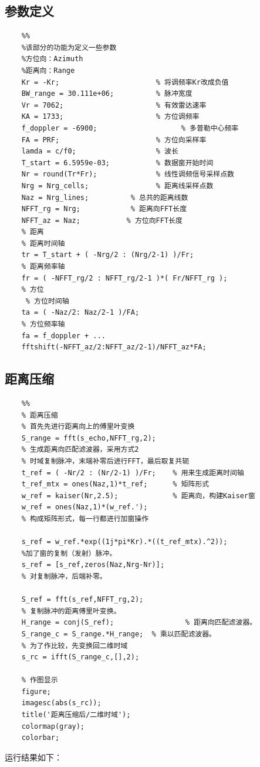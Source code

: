 \documentclass{article}
\begin{document}
\subsection{参数定义}
\begin{lstlisting}
	%%
	%该部分的功能为定义一些参数
	%方位向：Azimuth
	%距离向：Range
	Kr = -Kr;                       % 将调频率Kr改成负值
	BW_range = 30.111e+06;          % 脉冲宽度
	Vr = 7062;                      % 有效雷达速率
	KA = 1733;                      % 方位调频率
	f_doppler = -6900;                    % 多普勒中心频率
	FA = PRF;                       % 方位向采样率
	lamda = c/f0;                   % 波长
	T_start = 6.5959e-03;           % 数据窗开始时间
	Nr = round(Tr*Fr);              % 线性调频信号采样点数
	Nrg = Nrg_cells;                % 距离线采样点数
	Naz = Nrg_lines;          % 总共的距离线数
	NFFT_rg = Nrg;            % 距离向FFT长度
	NFFT_az = Naz;           % 方位向FFT长度
	% 距离
	% 距离时间轴
	tr = T_start + ( -Nrg/2 : (Nrg/2-1) )/Fr;                       
	% 距离频率轴
	fr = ( -NFFT_rg/2 : NFFT_rg/2-1 )*( Fr/NFFT_rg );                 
	% 方位
	 % 方位时间轴
	ta = ( -Naz/2: Naz/2-1 )/FA; 
	% 方位频率轴
	fa = f_doppler + ...
	fftshift(-NFFT_az/2:NFFT_az/2-1)/NFFT_az*FA; 
\end{lstlisting}




\subsection{距离压缩}
\begin{lstlisting}
	%%  
	% 距离压缩
	% 首先先进行距离向上的傅里叶变换
	S_range = fft(s_echo,NFFT_rg,2);  
	% 生成距离向匹配滤波器，采用方式2
	% 时域复制脉冲，末端补零后进行FFT，最后取复共轭
	t_ref = ( -Nr/2 : (Nr/2-1) )/Fr;    % 用来生成距离时间轴
	t_ref_mtx = ones(Naz,1)*t_ref;      % 矩阵形式
	w_ref = kaiser(Nr,2.5);             % 距离向，构建Kaiser窗
	w_ref = ones(Naz,1)*(w_ref.');      
	% 构成矩阵形式，每一行都进行加窗操作
	
	s_ref = w_ref.*exp((1j*pi*Kr).*((t_ref_mtx).^2)); 
	%加了窗的复制（发射）脉冲。
	s_ref = [s_ref,zeros(Naz,Nrg-Nr)];     
	% 对复制脉冲，后端补零。
	 
	S_ref = fft(s_ref,NFFT_rg,2);         
	% 复制脉冲的距离傅里叶变换。
	H_range = conj(S_ref);                 % 距离向匹配滤波器。
	S_range_c = S_range.*H_range;  % 乘以匹配滤波器。          
	% 为了作比较，先变换回二维时域
	s_rc = ifft(S_range_c,[],2);   
	
	% 作图显示
	figure;
	imagesc(abs(s_rc));
	title('距离压缩后/二维时域'); 
	colormap(gray);
	colorbar;
\end{lstlisting}
运行结果如下：
\end{document}
